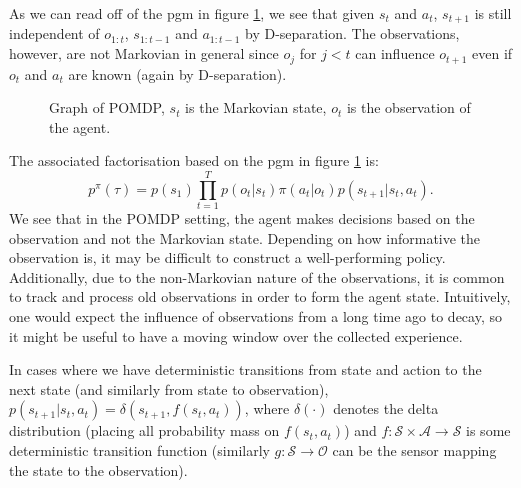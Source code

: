 \documentclass{report}
\numberwithin{equation}{section}
\numberwithin{figure}{section}
\numberwithin{table}{section}
\numberwithin{algorithm}{section}
\begin{document}
As we 
can read off of the pgm in figure \ref{fig:POMDP}, we see that given 
$s_t$ and $a_t$, $s_{t+1}$ is still independent of 
$o_{1:t}$, $s_{1:t-1}$ and $a_{1:t-1}$ by D-separation.
The observations, however, are not Markovian in general 
since $o_j$ for $j<t$ 
can influence $o_{t+1}$ even if $o_t$ and $a_t$ are known (again by 
D-separation).

\begin{figure}[H]
  \centering
  \caption{\label{fig:POMDP} Graph of POMDP, $s_t$ is the Markovian 
  state, $o_t$ is the observation of the agent.}
\end{figure}

The associated factorisation based on the pgm in 
figure \ref{fig:POMDP} is:
\begin{equation}
  p^{\pi}(\tau)=p(s_1)\prod_{t=1}^T p(o_t|s_t)\pi(a_t|o_t)p(s_{t+1}|s_t, a_t).
\end{equation}
We see that in the POMDP setting, the agent makes decisions based 
on the observation and not the Markovian state. Depending on how 
informative the observation is, it may be difficult to construct 
a well-performing policy. Additionally, due to the non-Markovian 
nature of the observations, it is common to track and process old 
observations in order to form the agent state. Intuitively, one 
would expect the influence of observations from a long time ago 
to decay, so it might be useful to have a moving window over the 
collected experience.

In cases where we have deterministic transitions from state and action 
to the next state (and similarly from state to observation), 
$p(s_{t+1}|s_t, a_t)=\delta(s_{t+1},f(s_t, a_t))$, where 
$\delta(\cdot)$ denotes the delta distribution (placing all 
probability mass on $f(s_t, a_t)$) and 
$f: \mathcal{S}\times\mathcal{A}\rightarrow \mathcal{S}$ is some deterministic 
transition function (similarly $g:\mathcal{S}\rightarrow \mathcal{O}$ 
can be the sensor mapping the state to the observation).
\end{document}
